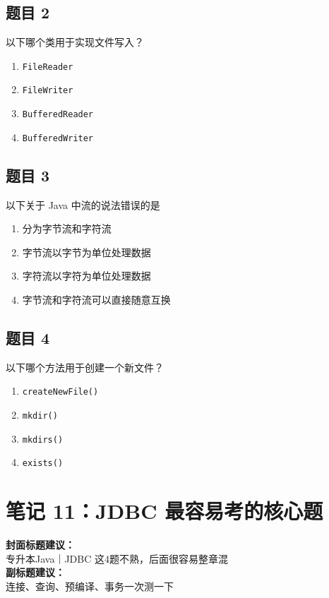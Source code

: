 \documentclass[12pt,a4paper]{ctexart}
\begin{document}
\subsection*{题目 2}
以下哪个类用于实现文件写入？
\begin{enumerate}[label=\Alph*.]
    \item \texttt{FileReader}
    \item \texttt{FileWriter}
    \item \texttt{BufferedReader}
    \item \texttt{BufferedWriter}
\end{enumerate}

\subsection*{题目 3}
以下关于 Java 中流的说法错误的是
\begin{enumerate}[label=\Alph*.]
    \item 分为字节流和字符流
    \item 字节流以字节为单位处理数据
    \item 字符流以字符为单位处理数据
    \item 字节流和字符流可以直接随意互换
\end{enumerate}

\subsection*{题目 4}
以下哪个方法用于创建一个新文件？
\begin{enumerate}[label=\Alph*.]
    \item \texttt{createNewFile()}
    \item \texttt{mkdir()}
    \item \texttt{mkdirs()}
    \item \texttt{exists()}
\end{enumerate}

\newpage

\section{笔记 11：JDBC 最容易考的核心题}
\begin{coverbox}
\textbf{封面标题建议：}\\
专升本Java｜JDBC 这4题不熟，后面很容易整章混\\
\textbf{副标题建议：}\\
连接、查询、预编译、事务一次测一下
\end{coverbox}
\end{document}
